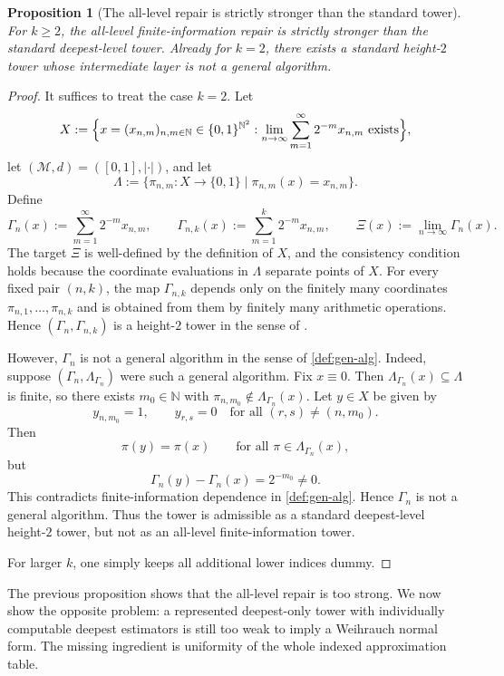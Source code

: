 \documentclass{lmcs} %
\theoremstyle{plain}
\theoremstyle{plain}
\newtheorem{proposition}[theorem]{Proposition}
\theoremstyle{definition}
\theoremstyle{remark}
\theoremstyle{definition}
\theoremstyle{remark}
\numberwithin{equation}{section}
\begin{document}
\begin{proposition}[The all-level repair is strictly stronger than the standard tower]\label{prop:all-level-strictly-stronger}
For \(k\ge2\), the all-level finite-information repair is strictly stronger than the standard deepest-level tower. Already for \(k=2\), there exists a standard height-\(2\) tower whose intermediate layer is not a general algorithm.
\end{proposition}
\begin{proof}
	It suffices to treat the case $k=2$.
	Let
	\[
	X
	:=
	\Bigl\{
	x=(x_{n,m})_{n,m\in\mathbb N}\in\{0,1\}^{\mathbb N^2}
	:
	\lim_{n\to\infty}\sum_{m=1}^{\infty}2^{-m}x_{n,m}\text{ exists}
	\Bigr\},
	\]
	let $(\mathcal M,d)=([0,1],|\cdot|)$, and let
	\[
	\Lambda:=\{\pi_{n,m}:X\to\{0,1\}\mid \pi_{n,m}(x)=x_{n,m}\}.
	\]
	Define
	\[
	\Gamma_n(x):=\sum_{m=1}^{\infty}2^{-m}x_{n,m},
	\qquad
	\Gamma_{n,k}(x):=\sum_{m=1}^{k}2^{-m}x_{n,m},
	\qquad
	\Xi(x):=\lim_{n\to\infty}\Gamma_n(x).
	\]
	The target \(\Xi\) is well-defined by the definition of \(X\), and the consistency condition holds because the coordinate evaluations in \(\Lambda\) separate points of \(X\).
	For every fixed pair $(n,k)$, the map $\Gamma_{n,k}$ depends only on the finitely many
	coordinates $\pi_{n,1},\ldots,\pi_{n,k}$ and is obtained from them by finitely many
	arithmetic operations.
	Hence $(\Gamma_n,\Gamma_{n,k})$ is a height-$2$ tower in the sense of \cite[Definition~3.1]{hansen2011solvability}.
	
	However, $\Gamma_n$ is not a general algorithm in the sense of \cref{def:gen-alg}.
	Indeed, suppose $(\Gamma_n,\Lambda_{\Gamma_n})$ were such a general algorithm.
	Fix $x\equiv 0$.
	Then $\Lambda_{\Gamma_n}(x)\subseteq \Lambda$ is finite, so there exists $m_0\in\mathbb N$
	with $\pi_{n,m_0}\notin \Lambda_{\Gamma_n}(x)$.
	Let $y\in X$ be given by
	\[
	y_{n,m_0}=1,
	\qquad
	y_{r,s}=0 \quad \text{for all }(r,s)\neq (n,m_0).
	\]
	Then
	\[
	\pi(y)=\pi(x)\qquad\text{for all }\pi\in\Lambda_{\Gamma_n}(x),
	\]
	but
	\[
	\Gamma_n(y)-\Gamma_n(x)=2^{-m_0}\neq 0.
	\]
	This contradicts finite-information dependence in \cref{def:gen-alg}.
	Hence \(\Gamma_n\) is not a general algorithm.  Thus the tower is admissible as a
standard deepest-level height-\(2\) tower, but not as an all-level finite-information
tower.
	
	For larger $k$, one simply keeps all additional lower indices dummy.
\end{proof}

The previous proposition shows that the all-level repair is too strong. We now show
the opposite problem: a represented deepest-only tower with individually computable
deepest estimators is still too weak to imply a Weihrauch normal form.  The missing
ingredient is uniformity of the whole indexed approximation table.
\end{document}
